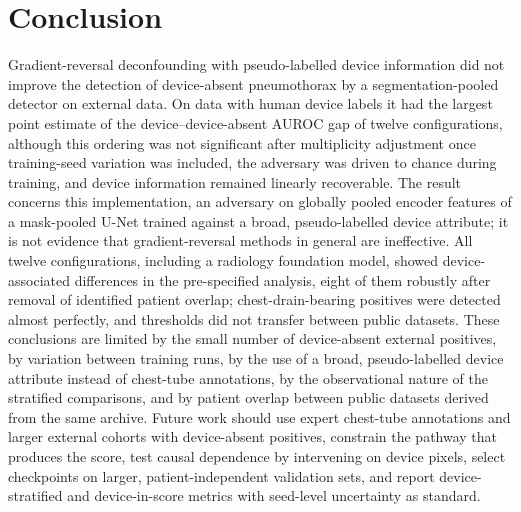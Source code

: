 \documentclass{ieeeaccess}
\begin{document}
\section{Conclusion}
\label{sec:conclusion}
Gradient-reversal deconfounding with pseudo-labelled device information did not improve the detection of device-absent pneumothorax by a segmentation-pooled detector on external data. On data with human device labels it had the largest point estimate of the device--device-absent AUROC gap of twelve configurations, although this ordering was not significant after multiplicity adjustment once training-seed variation was included, the adversary was driven to chance during training, and device information remained linearly recoverable. The result concerns this implementation, an adversary on globally pooled encoder features of a mask-pooled U-Net trained against a broad, pseudo-labelled device attribute; it is not evidence that gradient-reversal methods in general are ineffective. All twelve configurations, including a radiology foundation model, showed device-associated differences in the pre-specified analysis, eight of them robustly after removal of identified patient overlap; chest-drain-bearing positives were detected almost perfectly, and thresholds did not transfer between public datasets. These conclusions are limited by the small number of device-absent external positives, by variation between training runs, by the use of a broad, pseudo-labelled device attribute instead of chest-tube annotations, by the observational nature of the stratified comparisons, and by patient overlap between public datasets derived from the same archive. Future work should use expert chest-tube annotations and larger external cohorts with device-absent positives, constrain the pathway that produces the score, test causal dependence by intervening on device pixels, select checkpoints on larger, patient-independent validation sets, and report device-stratified and device-in-score metrics with seed-level uncertainty as standard.
\end{document}

